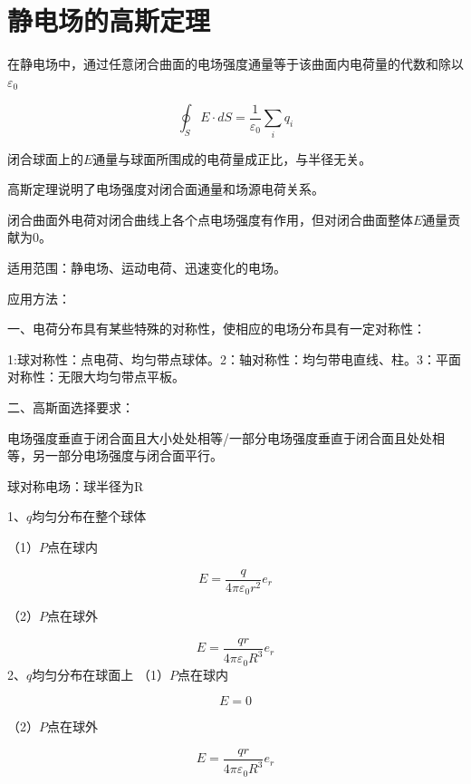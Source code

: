 
	
	
	\section{静电场的高斯定理}
	
	\begin{definition}[高斯定理]
		在静电场中，通过任意闭合曲面的电场强度通量等于该曲面内电荷量的代数和除以$\varepsilon _{0}$
		
		$$\oint _{S}E\cdot dS=\frac{1}{\varepsilon _{0}}\sum _{i}q_{i}$$
		
	\end{definition}
	
	\begin{note}
		
		闭合球面上的$E$通量与球面所围成的电荷量成正比，与半径无关。
		
		高斯定理说明了电场强度对闭合面通量和场源电荷关系。
		
		闭合曲面外电荷对闭合曲线上各个点电场强度有作用，但对闭合曲面整体$E$通量贡献为$0$。
		
		适用范围：静电场、运动电荷、迅速变化的电场。
	\end{note}
	
应用方法：

一、电荷分布具有某些特殊的对称性，使相应的电场分布具有一定对称性：
\begin{example}
	1:球对称性：点电荷、均匀带点球体。2：轴对称性：均匀带电直线、柱。3：平面对称性：无限大均匀带点平板。
\end{example}

二、高斯面选择要求：

	电场强度垂直于闭合面且大小处处相等/一部分电场强度垂直于闭合面且处处相等，另一部分电场强度与闭合面平行。

\begin{example}
	球对称电场：球半径为R
	
1、$q$均匀分布在整个球体
	
（1）$P$点在球内
	
$$E = \frac{q}{4\pi\varepsilon _{0}r^2}e_r$$

（2）$P$点在球外

$$E = \frac{qr}{4\pi\varepsilon _{0}R^3}e_r$$
2、$q$均匀分布在球面上
（1）$P$点在球内

$$E =0$$

（2）$P$点在球外

$$E = \frac{qr}{4\pi\varepsilon _{0}R^3}e_r$$


\end{example}


